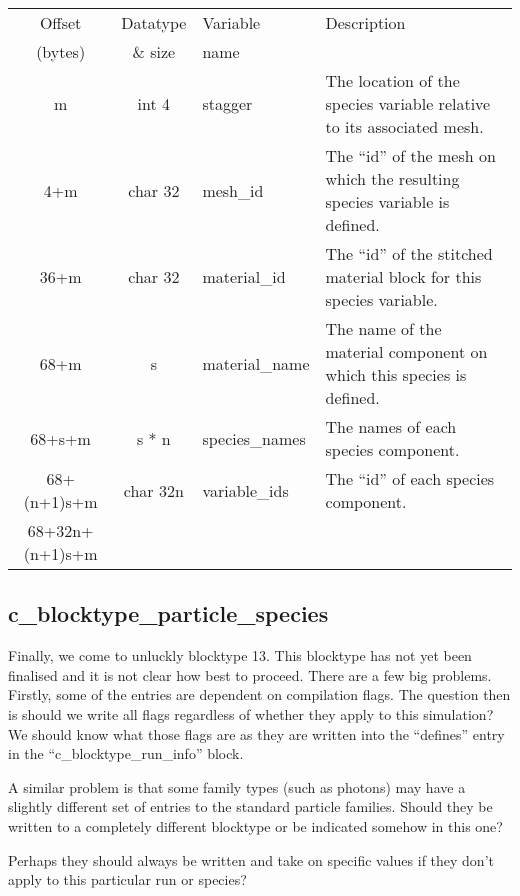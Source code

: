 \documentclass[12pt]{article}
\newcommand{\subsubsec}{\subsection}
\begin{document}
\begin{center}
\begin{tabularx}{0.9\textwidth}[!hbt]{cclX}
  Offset & Datatype & Variable & Description\\
  (bytes) & \& size & name &
  \\\toprule

  m & int 4 & stagger & The location of the species variable relative to its
  associated mesh.
  \\\midrule

  4+m & char 32 & mesh\_id & The ``id'' of the mesh on which the resulting
  species variable is defined.
  \\\midrule

  36+m & char 32 & material\_id & The ``id'' of the stitched material block
  for this species variable.
  \\\midrule

  68+m & s & material\_name & The name of the material component on which
  this species is defined.
  \\\midrule

  68+s+m & s * n & species\_names & The names of each species component.
  \\\midrule

  68+(n+1)s+m & char 32n & variable\_ids & The ``id'' of each species component.
  \\\midrule

  68+32n+(n+1)s+m &
\end{tabularx}
\end{center}\vspace{10pt}


\subsubsec{c\_blocktype\_particle\_species}

Finally, we come to unluckly blocktype 13.
This blocktype has not yet been finalised and it is not clear how best to
proceed. There are a few big problems. Firstly,
some of the entries are dependent on compilation flags. The question then
is should we write all flags regardless of whether they apply to this
simulation? We should know what those flags are as they are written into
the ``defines'' entry in the ``c\_blocktype\_run\_info'' block.

A similar problem is that some family types (such as photons) may have
a slightly different set of entries to the standard particle families.
Should they be written to a completely different blocktype or be indicated
somehow in this one?

Perhaps they should always be written and take on specific values if they
don't apply to this particular run or species?
\end{document}
